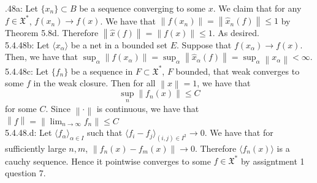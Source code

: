 \documentclass[letterpaper]{article}
\newcommand{\lan}{\langle}
\newcommand{\ran}{\rangle}
\newcommand{\norm}[1]{\left\lVert#1\right\rVert}
\newcommand{\inn}[1]{\lan#1\ran}
\newcommand{\X}{\mathfrak{X}}
\begin{document}
 .48a: Let $\{x_n\} \subset B$ be a sequence converging to some $x$. We claim that for any $f\in \X^\ast$, 
$f(x_n) \to f(x)$. We have that $\norm{f(x_n)} = \norm{\hat{x}_n (f)} \leq 1$ by Theorem 5.8d. Therefore $\norm{\hat{x}(f)} = \norm{f(x)}\leq 1$. As desired. 
\newline \\ 5.4.48b: Let $\inn{x_\alpha}$ be a net in a bounded set $E$. Suppose that $f(x_\alpha)\to f(x)$. Then, we have that $\sup_\alpha \norm{f(x_\alpha)} = \sup_\alpha \norm{\hat{x}_\alpha (f)} = \sup_\alpha\norm{x_\alpha} < \infty.$ 
\newline \\ 5.4.48c: Let $\{f_n\}$ be a sequence in $F\subset \X^\ast$, $F$ bounded,  that weak converges to some $f$ in the weak closure. Then for all $\norm{x} =1$, we have that $$\sup_n \norm{f_n(x)} \leq C$$ for some $C$. Since $\norm{\cdot}$ 
is continuous, we have that $\norm{f} = \norm{\lim_{n\to \infty} f_n} \leq C$ 
\newline \\ 5.4.48.d: Let $\inn{f_\alpha}_{\alpha \in I}$ such that $\inn{f_i-f_j}_{(i,j)\in I^2} \to 0$. We have that for sufficiently large $n,m$, $\norm{f_n(x) - f_m(x)}\to 0$. Therefore $\inn{f_n(x)}$ is a cauchy sequence. Hence it pointwise converges to some $f\in \X^\ast$ by assigntment 1 question 7. 
\end{document}
